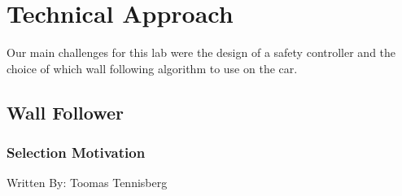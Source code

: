 \documentclass{article}
\begin{document}
\section{Technical Approach}

Our main challenges for this lab were the design of a safety controller and the choice of which wall following algorithm to use on the car.

\subsection{Wall Follower}
\subsubsection{Selection Motivation}
Written By: Toomas Tennisberg\\
\end{document}
